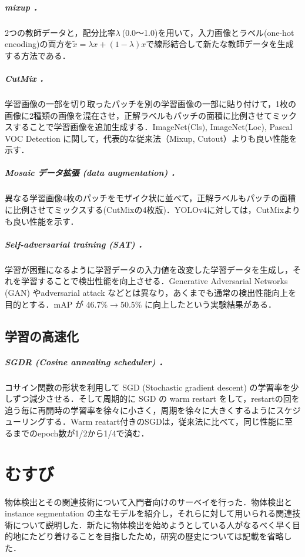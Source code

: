 \documentclass[twocolumn]{jsarticle} %
\begin{document}
\subparagraph{mixup \cite{ZCDL18}．} 2つの教師データと，配分比率$\lambda\ $(0.0〜1.0)を用いて，入力画像とラベル(one-hot encoding)の両方を$\tilde{x}=\lambda x+(1-\lambda)x$で線形結合して新たな教師データを生成する方法である．

\subparagraph{CutMix \cite{YHCOYC19}．} \label{sec:CutMix} 学習画像の一部を切り取ったパッチを別の学習画像の一部に貼り付けて，1枚の画像に2種類の画像を混在させ，正解ラベルもパッチの面積に比例させてミックスすることで学習画像を追加生成する．ImageNet(Cls), ImageNet(Loc), Pascal VOC Detection に関して，代表的な従来法（Mixup, Cutout）よりも良い性能を示す．

\subparagraph{Mosaic データ拡張 (data augmentation) \cite{BWL20}．} \label{sec:mosaic}
異なる学習画像4枚のパッチをモザイク状に並べて，正解ラベルもパッチの面積に比例させてミックスする(CutMixの4枚版)．YOLOv4に対しては，CutMixよりも良い性能を示す．

\subparagraph{Self-adversarial training (SAT) \cite{BWL20}．} \label{sec:SAT} 学習が困難になるように学習データの入力値を改変した学習データを生成し，それを学習することで検出性能を向上させる．Generative Adversarial Networks (GAN) やadversarial attack などとは異なり，あくまでも通常の検出性能向上を目的とする．mAP が 46.7\%{$\rightarrow$}50.5\% に向上したという実験結果がある．

\subsection{学習の高速化}
\subparagraph{SGDR (Cosine annealing scheduler) \cite{LoshHut17}．} \label{sec:cos} コサイン関数の形状を利用して SGD (Stochastic gradient descent) の学習率を少しずつ減少させる．そして周期的に SGD の warm restart をして，restartの回を追う毎に再開時の学習率を徐々に小さく，周期を徐々に大きくするようにスケジューリングする．Warm reatart付きのSGDは，従来法に比べて，同じ性能に至るまでのepoch数が1/2から1/4で済む．


\section{むすび}
物体検出とその関連技術について入門者向けのサーベイを行った．物体検出と instance segmentation の主なモデルを紹介し，それらに対して用いられる関連技術について説明した．新たに物体検出を始めようとしている人がなるべく早く目的地にたどり着けることを目指したため，研究の歴史については記載を省略した．
\end{document}
